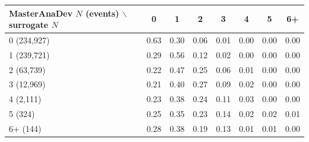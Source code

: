 \begin{tabular}{lccccccc}
\toprule
MasterAnaDev $N$ (events) $\backslash$ surrogate $N$ & 0 & 1 & 2 & 3 & 4 & 5 & 6+ \\
\midrule
0 (234,927) & 0.63 & 0.30 & 0.06 & 0.01 & 0.00 & 0.00 & 0.00 \\
1 (239,721) & 0.29 & 0.56 & 0.12 & 0.02 & 0.00 & 0.00 & 0.00 \\
2 (63,739) & 0.22 & 0.47 & 0.25 & 0.06 & 0.01 & 0.00 & 0.00 \\
3 (12,969) & 0.21 & 0.40 & 0.27 & 0.09 & 0.02 & 0.00 & 0.00 \\
4 (2,111) & 0.23 & 0.38 & 0.24 & 0.11 & 0.03 & 0.00 & 0.00 \\
5 (324) & 0.25 & 0.35 & 0.23 & 0.14 & 0.02 & 0.02 & 0.01 \\
6+ (144) & 0.28 & 0.38 & 0.19 & 0.13 & 0.01 & 0.01 & 0.00 \\
\bottomrule
\end{tabular}
